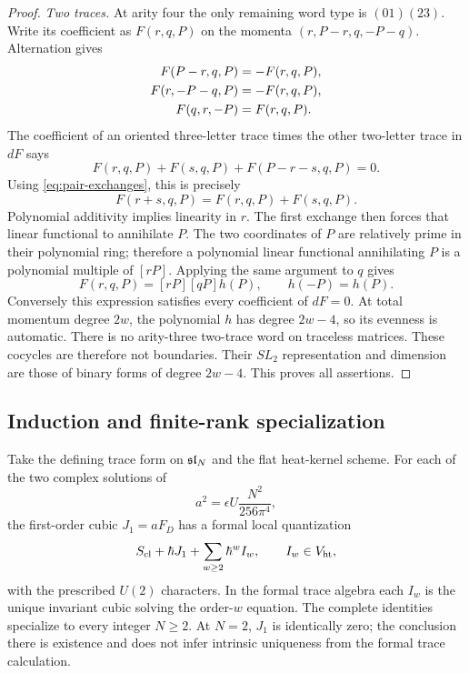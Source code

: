 \begin{proof}
\emph{Two traces.}
At arity four the only remaining word type is $(01)(23)$.
Write its coefficient as $F(r,q,P)$ on the momenta
$(r,P-r,q,-P-q)$.  Alternation gives
\begin{align}
 F(P-r,q,P)&=-F(r,q,P),\notag\\
 F(r,-P-q,P)&=-F(r,q,P),\notag\\
 F(q,r,-P)&=F(r,q,P).
 \label{eq:pair-exchanges}
\end{align}
The coefficient of an oriented three-letter trace times the other
two-letter trace in $dF$ says
\begin{equation}
 F(r,q,P)+F(s,q,P)+F(P-r-s,q,P)=0.
\end{equation}
Using \eqref{eq:pair-exchanges}, this is precisely
\begin{equation}
 F(r+s,q,P)=F(r,q,P)+F(s,q,P).
 \label{eq:pair-additivity}
\end{equation}
Polynomial additivity implies linearity in $r$.  The first exchange
then forces that linear functional to annihilate $P$.  The two
coordinates of $P$ are relatively prime in their polynomial ring;
therefore a polynomial linear functional annihilating $P$ is a
polynomial multiple of $[rP]$.  Applying the same argument to $q$
gives
\begin{equation}
 F(r,q,P)=[rP][qP]h(P),\qquad h(-P)=h(P).
\end{equation}
Conversely this expression satisfies every coefficient of $dF=0$.
At total momentum degree $2w$, the polynomial $h$ has degree
$2w-4$, so its evenness is automatic.  There is no arity-three
two-trace word on traceless matrices.  These cocycles are therefore
not boundaries.  Their $SL_2$ representation and dimension are those
of binary forms of degree $2w-4$.  This proves all assertions.
\end{proof}

\subsection{Induction and finite-rank specialization}

\begin{theorem}
\label{thm:all-orders-traceless}
Take the defining trace form on $\mathfrak{sl}_N$ and the flat heat-kernel
scheme.  For each of the two complex solutions of
\begin{equation}
 a^2=\epsilon U\frac{N^2}{256\pi^4},
 \label{eq:all-order-leading-root}
\end{equation}
the first-order cubic $J_1=aF_D$ has a formal local quantization
\begin{equation}
 S_{\mathrm{cl}}+\hbar J_1+\sum_{w\ge2}\hbar^w I_w,
 \qquad I_w\in V_{\mathrm{ht}},
 \label{eq:all-order-action}
\end{equation}
with the prescribed $U(2)$ characters.  In the formal trace algebra
each $I_w$ is the unique invariant cubic solving the order-$w$
equation.  The complete identities specialize to every integer
$N\ge2$.  At $N=2$, $J_1$ is identically zero; the conclusion there
is existence and does not infer intrinsic uniqueness from the formal
trace calculation.
\end{theorem}

